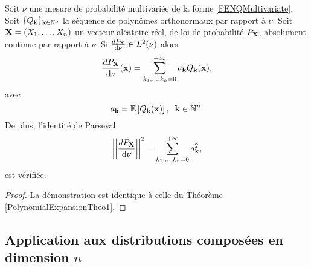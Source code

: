 \begin{Theo}\label{MultivariatePolynomialExpansion}
Soit $\nu$ une mesure de probabilité multivariée de la forme \eqref{FENQMultivariate}. Soit $\{Q_{\bold{k}}\}_{\bold{k\in\mathbb{N}^{n}}}$ la séquence de polynômes orthonormaux par rapport à $\nu$. Soit $\bold{X}=(X_{1},\ldots,X_{n})$ un vecteur aléatoire réel, de loi de probabilité $P_{\bold{X}}$, absolument continue par rapport à $\nu$. Si $\frac{dP_{\bold{X}}}{\text{d}\nu}\in L^{2}(\nu)$ alors 
\begin{equation*}
\frac{dP_{\bold{X}}}{\text{d}\nu}(\bold{x})=\sum_{k_{1},\ldots,k_{n}=0}^{+\infty}a_{\bold{k}}Q_{\bold{k}}(\bold{x}),
\end{equation*}
avec
\begin{equation*}
a_{\bold{k}}=\mathbb{E}\left[Q_{\bold{k}}(\bold{x})\right],\hspace{0.2cm} \bold{k}\in\mathbb{N}^{n}.
\end{equation*}
De plus, l'identité de Parseval 
\begin{equation*}
\left|\left|\frac{dP_{\bold{X}}}{\text{d}\nu}\right|\right|^{2}=\sum_{k_{1},\ldots,k_{n}=0}^{+\infty}a_{\bold{k}}^{2},
\end{equation*}
est vérifiée.
\end{Theo}
\begin{proof}
La démonstration est identique à celle du Théorème \ref{PolynomialExpansionTheo1}. 
\end{proof}
\subsection{Application aux distributions composées en dimension $n$}
